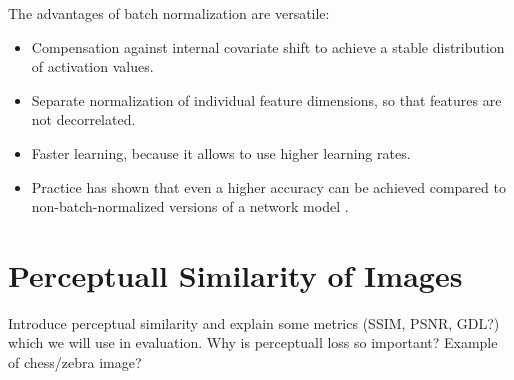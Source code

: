 The advantages of batch normalization are versatile:

\begin{itemize}
\item Compensation against internal covariate shift to achieve a stable distribution of activation values.
\item Separate normalization of individual feature dimensions, so that features are not decorrelated.
\item Faster learning, because it allows to use higher learning rates.
\item Practice has shown that even a higher accuracy can be achieved compared to non-batch-normalized versions of a network model \parencite[p. 7]{batchnorm}.
\end{itemize}


\section{Perceptuall Similarity of Images}

Introduce perceptual similarity and explain some metrics (SSIM, PSNR, GDL?) which we will use in evaluation.
Why is perceptuall loss so important? Example of chess/zebra image?

